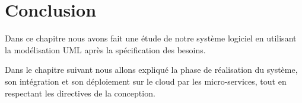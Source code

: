    \section{Conclusion}
   
   Dans ce chapitre nous avons fait une étude de notre système logiciel en utilisant la modélisation UML après la spécification des besoins. 
     
        Dans le chapitre suivant nous allons expliqué la phase de réalisation du système, son intégration et son déploiement sur le  cloud par les micro-services, tout en respectant les directives de la conception.
    
   